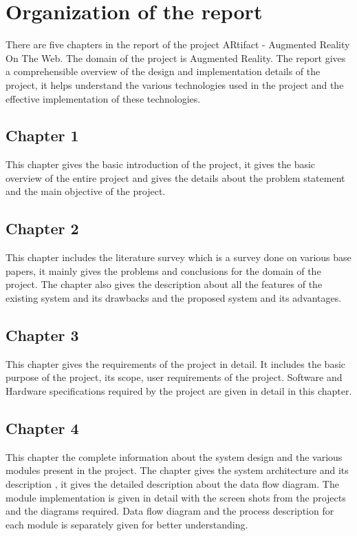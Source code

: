 \documentclass[BTech]{srmuthesis}
\begin{document}
\section{Organization of the report}
There are five chapters in the report of the project ARtifact - Augmented Reality On The Web. The domain of the project is Augmented Reality. The report gives a comprehensible overview of the design and implementation details of the project, it helps understand the various technologies used in the project and the effective implementation of these technologies.
 
\subsection*{Chapter 1}
This chapter gives the basic introduction of the project, it gives the basic overview of the entire project and gives the details about the problem statement and the main objective of the project.

\subsection*{Chapter 2}
This chapter includes the literature survey which is a survey done on various base papers, it mainly gives the problems and conclusions for the domain of the project. The chapter also gives the description about  all the features of the existing system and its drawbacks and the proposed system and its advantages.

\subsection*{Chapter 3}
This chapter gives the requirements of the project in detail. It includes the basic purpose of the project, its scope, user requirements of the project. Software and Hardware specifications required by the project are given in detail in this chapter.

\subsection*{Chapter 4}
This chapter the complete information about the system design and the various modules present in the project. The chapter gives the system architecture and its description , it gives the detailed description about the data flow diagram. The module implementation is given in detail with the screen shots from the projects and the diagrams required. Data flow diagram and the process description for each module is separately given for better understanding.
\end{document}
